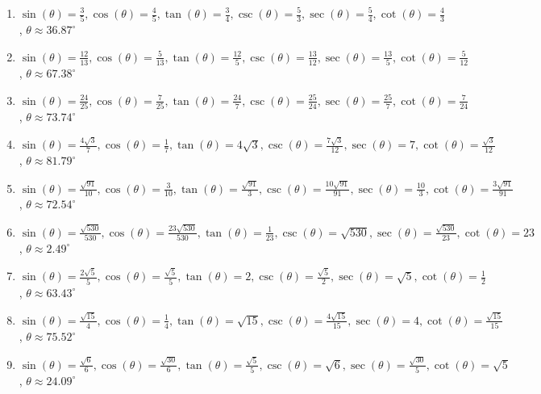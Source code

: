 \begin{enumerate}

\setcounter{enumi}{\value{HW}}

\item $\sin(\theta) = \frac{3}{5}, \cos(\theta) = \frac{4}{5}, \tan(\theta) = \frac{3}{4}, \csc(\theta) = \frac{5}{3}, \sec(\theta) = \frac{5}{4}, \cot(\theta) = \frac{4}{3}$, $\theta \approx 36.87^{\circ}$

\item $\sin(\theta) = \frac{12}{13}, \cos(\theta) = \frac{5}{13}, \tan(\theta) = \frac{12}{5}, \csc(\theta) = \frac{13}{12}, \sec(\theta) = \frac{13}{5}, \cot(\theta) = \frac{5}{12}$, $\theta \approx 67.38^{\circ}$

\item $\sin(\theta) = \frac{24}{25}, \cos(\theta) = \frac{7}{25}, \tan(\theta) = \frac{24}{7}, \csc(\theta) = \frac{25}{24}, \sec(\theta) = \frac{25}{7}, \cot(\theta) = \frac{7}{24}$, $\theta \approx 73.74^{\circ}$

\item $\sin(\theta) = \frac{4\sqrt{3}}{7}, \cos(\theta) = \frac{1}{7}, \tan(\theta) = 4\sqrt{3}, \csc(\theta) = \frac{7\sqrt{3}}{12}, \sec(\theta) = 7, \cot(\theta) = \frac{\sqrt{3}}{12}$,  $\theta \approx 81.79^{\circ}$

\item $\sin(\theta) = \frac{\sqrt{91}}{10}, \cos(\theta) = \frac{3}{10}, \tan(\theta) = \frac{\sqrt{91}}{3}, \csc(\theta) = \frac{10\sqrt{91}}{91}, \sec(\theta) = \frac{10}{3}, \cot(\theta) = \frac{3\sqrt{91}}{91}$, $\theta \approx 72.54^{\circ}$

\item $\sin(\theta) = \frac{\sqrt{530}}{530}, \cos(\theta) = \frac{23\sqrt{530}}{530}, \tan(\theta) = \frac{1}{23}, \csc(\theta) = \sqrt{530}, \sec(\theta) = \frac{\sqrt{530}}{23}, \cot(\theta) = 23$, $\theta \approx 2.49^{\circ}$

\item $\sin(\theta) = \frac{2\sqrt{5}}{5}, \cos(\theta) = \frac{\sqrt{5}}{5}, \tan(\theta) = 2, \csc(\theta) = \frac{\sqrt{5}}{2}, \sec(\theta) = \sqrt{5}, \cot(\theta) = \frac{1}{2}$, $\theta \approx 63.43^{\circ}$

\item  $\sin(\theta) = \frac{\sqrt{15}}{4}, \cos(\theta) = \frac{1}{4}, \tan(\theta) = \sqrt{15}, \csc(\theta) = \frac{4\sqrt{15}}{15}, \sec(\theta) = 4, \cot(\theta) = \frac{\sqrt{15}}{15}$, $\theta \approx 75.52^{\circ}$

\item $\sin(\theta) = \frac{\sqrt{6}}{6}, \cos(\theta) = \frac{\sqrt{30}}{6}, \tan(\theta) = \frac{\sqrt{5}}{5}, \csc(\theta) = \sqrt{6}, \sec(\theta) = \frac{\sqrt{30}}{5}, \cot(\theta) = \sqrt{5}$, $\theta \approx 24.09^{\circ}$


\end{enumerate}
